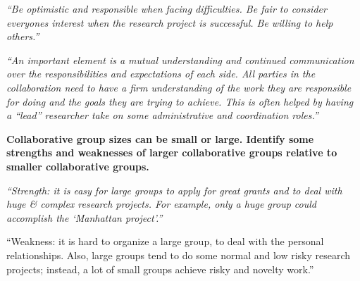 \documentclass[portrait,11pt]{seminar}
\begin{document}
\es
\bs


\es {}

{\it ``Be optimistic and responsible when facing difficulties. Be fair to consider everyones interest when the research project is successful. Be willing to help others.''}


\medskip

{\it ``An important element is a mutual understanding and continued communication over the responsibilities and expectations of each side. All parties in the collaboration need to have a firm understanding of the work they are responsible for doing and the goals they are trying to achieve. This is often helped by having a “lead” researcher take on some administrative and coordination roles.''}





\es \bs 
{\bf Collaborative group sizes can be small or large. Identify some strengths and weaknesses of larger collaborative groups relative to smaller collaborative groups.
}

{\it ``Strength: it is easy for large groups to apply for great grants and to deal with huge \& complex research projects. For example, only a huge group could accomplish the `Manhattan project'.''

``Weakness: it is hard to organize a large group, to deal with the personal relationships. Also, large groups tend to do some normal and low risky research projects; instead, a lot of small groups achieve risky and novelty work.''
}
\end{document}
